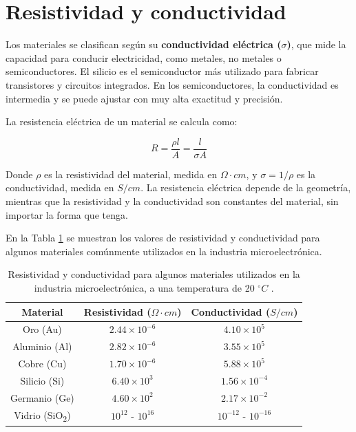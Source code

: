 \section{Resistividad y conductividad}

Los materiales se clasifican según su \textbf{conductividad eléctrica ($\sigma$)}, que mide la capacidad para conducir electricidad, como metales, no metales o semiconductores. El silicio es el semiconductor más utilizado para fabricar transistores y circuitos integrados. En los semiconductores, la conductividad es intermedia y se puede ajustar con muy alta exactitud y precisión.

La resistencia eléctrica de un material se calcula como:

\[ R = \dfrac{\rho l}{A} = \dfrac{l}{\sigma A} \]

Donde $\rho$ es la resistividad del material, medida en $\Omega{}\cdot{}cm$, y $\sigma=1/\rho$ es la conductividad, medida en $S/cm$. La resistencia eléctrica depende de la geometría, mientras que la resistividad y la conductividad son constantes del material, sin importar la forma que tenga. 

En la Tabla \ref{tabla_resistividad_conductividad} se muestran los valores de resistividad y conductividad para algunos materiales comúnmente utilizados en la industria microelectrónica.

\begin{table}[H]
    \centering
    \caption{Resistividad y conductividad para algunos materiales utilizados en la industria microelectrónica, a una temperatura de 20 $^\circ{}C$ \cite{serway1998}.}
    \label{tabla_resistividad_conductividad}
    \begin{tabular}{|c|c|c|}
    \hline
        \textbf{Material} & \textbf{Resistividad ($\Omega{}\cdot{}cm$)} & \textbf{Conductividad ($S/cm$)} \\
        \hline 
        Oro (Au)        & $2.44\times{}10^{-6}$  & $4.10\times{}10^5$ \\
        Aluminio (Al)   & $2.82\times{}10^{-6}$  & $3.55\times{}10^5$ \\
        Cobre (Cu)	    & $1.70\times{}10^{-6}$  & $5.88\times{}10^5$ \\
        Silicio (Si)    & $6.40\times{}10^{3}$	 & $1.56\times{}10^{-4}$ \\
        Germanio (Ge)	& $4.60\times{}10^{2}$	 & $2.17\times{}10^{-2}$ \\
        Vidrio (SiO\textsubscript{2}) & $10^{12}$ - $10^{16}$ & $10^{-12}$ - $10^{-16}$ \\
        \hline
    \end{tabular}
\end{table}

